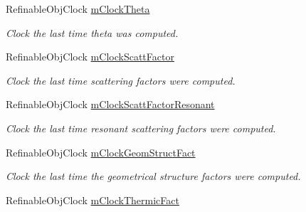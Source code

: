 \begin{DoxyCompactItemize}
\mbox{\label{class_obj_cryst_1_1_scattering_data_a22e1b86b0bc485070ebe11bf1461bbe3}} 
Refinable\+Obj\+Clock \mbox{\hyperlink{class_obj_cryst_1_1_scattering_data_a22e1b86b0bc485070ebe11bf1461bbe3}{m\+Clock\+Theta}}
\begin{DoxyCompactList}\small\item\em Clock the last time theta was computed. \end{DoxyCompactList}\item 
\mbox{\label{class_obj_cryst_1_1_scattering_data_a8ce62b5bfb1fcd804c67dbd930b1f548}} 
Refinable\+Obj\+Clock \mbox{\hyperlink{class_obj_cryst_1_1_scattering_data_a8ce62b5bfb1fcd804c67dbd930b1f548}{m\+Clock\+Scatt\+Factor}}
\begin{DoxyCompactList}\small\item\em Clock the last time scattering factors were computed. \end{DoxyCompactList}\item 
\mbox{\label{class_obj_cryst_1_1_scattering_data_af3c0765a73ec998573658cce33ccb2c1}} 
Refinable\+Obj\+Clock \mbox{\hyperlink{class_obj_cryst_1_1_scattering_data_af3c0765a73ec998573658cce33ccb2c1}{m\+Clock\+Scatt\+Factor\+Resonant}}
\begin{DoxyCompactList}\small\item\em Clock the last time resonant scattering factors were computed. \end{DoxyCompactList}\item 
\mbox{\label{class_obj_cryst_1_1_scattering_data_adae75c08082bf39716f00acf417a661c}} 
Refinable\+Obj\+Clock \mbox{\hyperlink{class_obj_cryst_1_1_scattering_data_adae75c08082bf39716f00acf417a661c}{m\+Clock\+Geom\+Struct\+Fact}}
\begin{DoxyCompactList}\small\item\em Clock the last time the geometrical structure factors were computed. \end{DoxyCompactList}\item 
\mbox{\label{class_obj_cryst_1_1_scattering_data_a4295811a2c12d31985b51e2ab6c40088}} 
Refinable\+Obj\+Clock \mbox{\hyperlink{class_obj_cryst_1_1_scattering_data_a4295811a2c12d31985b51e2ab6c40088}{m\+Clock\+Thermic\+Fact}}

\end{DoxyCompactItemize}
